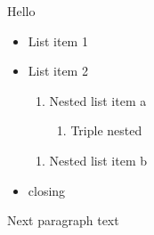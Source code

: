 \documentclass[11pt,a4paper]{article}
\begin{document}
\begin{figure}[h]
\end{figure}

Hello

\begin{itemize}
\item List item 1
\item List item 2
  \begin{enumerate}
\item Nested list item a
    \begin{enumerate}
\item Triple nested
    \end{enumerate}
  \end{enumerate}
  \begin{enumerate}
\item Nested list item b
  \end{enumerate}
\end{itemize}

\begin{itemize}
\item closing
\end{itemize}

Next paragraph text

\begin{table}[h]
\begin{tabular}{|l|}
\hline
 \\ \hline
\end{tabular}
\end{table}

\begin{figure}[h]
\end{figure}
\end{document}
